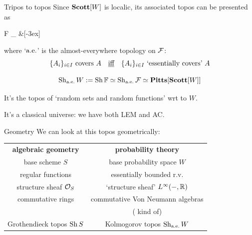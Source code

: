 \begin{frame}{Tripos to topos}
	Since $\mathbf{Scott}[W]$ is localic, its associated topos can be presented as
	\begin{diagram*}
		\Sh \alg F \equi \Sh_\aetop \F {} \&[-3ex] \Sh \F
	\end{diagram*}
	where `$\text{a.e.}$' is the almost-everywhere topology on $\mathcal{F}$:
	\begin{equation*}
		\text{$\{A_i\}_{i \in I}$ covers $A$}
		\quad\text{\underline{iff}}\quad
		\text{$\{A_i\}_{i \in I}$ `essentially covers' $A$}
	\end{equation*}

	\vfill
	\begin{definition}
		\begin{equation*}
			\operatorname{Sh}_{\text{a.e.}} W := \operatorname{Sh} \mathbb{F} \simeq \operatorname{Sh}_{\text{a.e.}} \mathcal{F} \simeq \mathbf{Pitts}[\mathbf{Scott}[W]]
		\end{equation*}
	\end{definition}

	\vfill
	It's the topos of `random sets and random functions' wrt to $W$.

	It's a classical universe: we have both LEM and AC.
\end{frame}


\begin{frame}{Geometry}
	We can look at this topos geometrically:

	\vfill
	\begin{center}
		\begin{tabularx}{\columnwidth}{C|c}
			\textbf{algebraic geometry} & \textbf{probability theory}\\[2ex]
			base scheme $S$ & base probability space $W$\\[2ex]
			regular functions & essentially bounded r.v.\\[2ex]
			structure sheaf $\mathcal{O}_S$ & `structure sheaf' $L^\infty(-,\mathbb{R})$\\[2ex]
			commutative rings & commutative Von Neumann algebras\\
			& ({\color{colorgold} kind of})\\[2ex]
			Grothendieck topos $\operatorname{Sh} S$ & {\color{colorgold}Kolmogorov topos} $\operatorname{Sh}_{\text{a.e.}} W$
		\end{tabularx}
	\end{center}
	\vfill
\end{frame}

